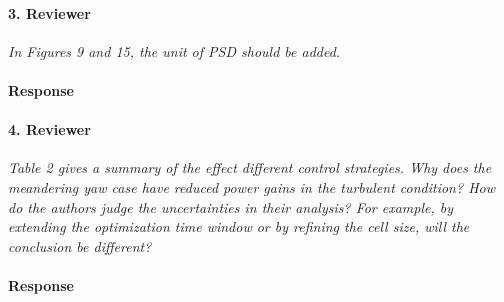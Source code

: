 \documentclass[]{article}
\begin{document}
\paragraph{3. Reviewer} \textit{In Figures 9 and 15, the unit of PSD should be added.}

\paragraph{Response} 

\hrulefill

\paragraph{4. Reviewer} \textit{Table 2 gives a summary of the effect different control strategies. Why does the meandering yaw case have reduced power gains in the turbulent condition? How do the authors judge the uncertainties in their analysis? For example, by extending the optimization time window or by refining the cell size, will the conclusion be different?}

\paragraph{Response} 

\hrulefill
\end{document}
